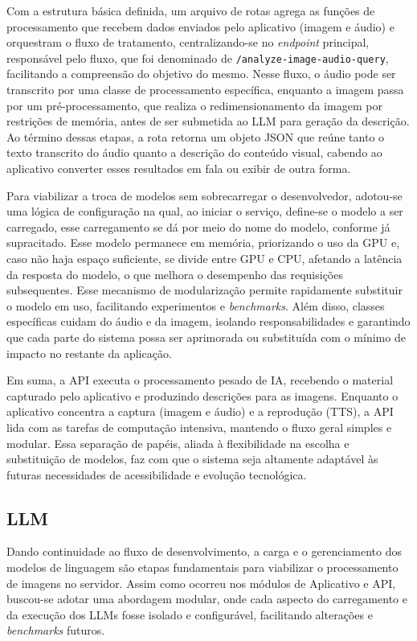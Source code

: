 Com a estrutura básica definida, um arquivo de rotas agrega as funções de processamento que recebem dados enviados pelo aplicativo (imagem e áudio) e orquestram o fluxo de tratamento, centralizando-se no \textit{endpoint} principal, responsável pelo fluxo, que foi denominado de \texttt{/analyze-image-audio-query}, facilitando a compreensão do objetivo do mesmo. Nesse fluxo, o áudio pode ser transcrito por uma classe de processamento específica, enquanto a imagem passa por um pré-processamento, que realiza o redimensionamento da imagem por restrições de memória, antes de ser submetida ao LLM para geração da descrição. Ao término dessas etapas, a rota retorna um objeto JSON que reúne tanto o texto transcrito do áudio quanto a descrição do conteúdo visual, cabendo ao aplicativo converter esses resultados em fala ou exibir de outra forma.

Para viabilizar a troca de modelos sem sobrecarregar o desenvolvedor, adotou-se uma lógica de configuração na qual, ao iniciar o serviço, define-se o modelo a ser carregado, esse carregamento se dá por meio do nome do modelo, conforme já supracitado. Esse modelo permanece em memória, priorizando o uso da GPU e, caso não haja espaço suficiente, se divide entre GPU e CPU, afetando a latência da resposta do modelo, o que melhora o desempenho das requisições subsequentes. Esse mecanismo de modularização permite rapidamente substituir o modelo em uso, facilitando experimentos e \textit{benchmarks}. Além disso, classes específicas cuidam do áudio e da imagem, isolando responsabilidades e garantindo que cada parte do sistema possa ser aprimorada ou substituída com o mínimo de impacto no restante da aplicação.

Em suma, a API executa o processamento pesado de IA, recebendo o material capturado pelo aplicativo e produzindo descrições para as imagens. Enquanto o aplicativo concentra a captura (imagem e áudio) e a reprodução (TTS), a API lida com as tarefas de computação intensiva, mantendo o fluxo geral simples e modular. Essa separação de papéis, aliada à flexibilidade na escolha e substituição de modelos, faz com que o sistema seja altamente adaptável às futuras necessidades de acessibilidade e evolução tecnológica.

\subsection{LLM}

Dando continuidade ao fluxo de desenvolvimento, a carga e o gerenciamento dos modelos de linguagem são etapas fundamentais para viabilizar o processamento de imagens no servidor. Assim como ocorreu nos módulos de Aplicativo e API, buscou-se adotar uma abordagem modular, onde cada aspecto do carregamento e da execução dos LLMs fosse isolado e configurável, facilitando alterações e \textit{benchmarks} futuros.

